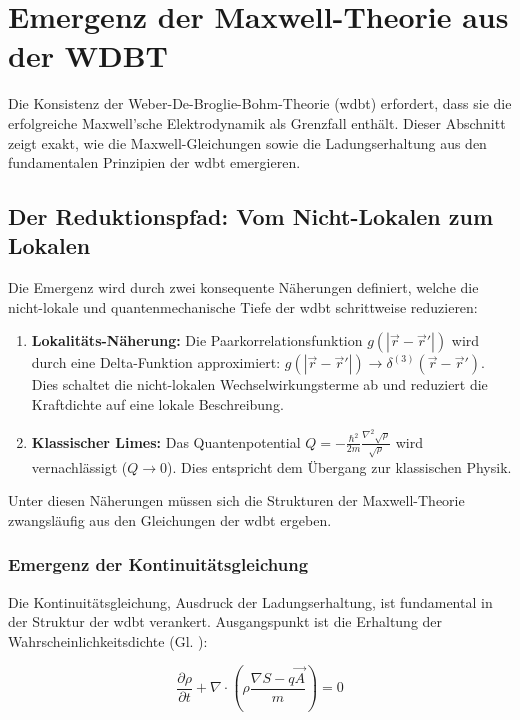 \chapter{Emergenz der Maxwell-Theorie aus der WDBT}
\label{sec:emergence-maxwell}

Die Konsistenz der Weber-De-Broglie-Bohm-Theorie (\gls{wdbt}) erfordert, dass sie die erfolgreiche Maxwell'sche Elektrodynamik als Grenzfall enthält. Dieser Abschnitt zeigt exakt, wie
die Maxwell-Gleichungen sowie die Ladungserhaltung aus den fundamentalen Prinzipien der \gls{wdbt} emergieren.

\section{Der Reduktionspfad: Vom Nicht-Lokalen zum Lokalen}

Die Emergenz wird durch zwei konsequente Näherungen definiert, welche die nicht-lokale und quantenmechanische Tiefe der \gls{wdbt} schrittweise reduzieren:

\begin{enumerate}
    \item \textbf{Lokalitäts-Näherung:} Die Paarkorrelationsfunktion $g(|\vec{r} - \vec{r}'|)$ wird durch eine Delta-Funktion approximiert: $g(|\vec{r} - \vec{r}'|) \rightarrow \delta^{(3)}(\vec{r} - \vec{r}')$. Dies schaltet die nicht-lokalen Wechselwirkungsterme ab und reduziert die Kraftdichte auf eine lokale Beschreibung.
    \item \textbf{Klassischer Limes:} Das Quantenpotential $Q = -\frac{\hbar^2}{2m} \frac{\nabla^2 \sqrt{\rho}}{\sqrt{\rho}}$ wird vernachlässigt ($Q \rightarrow 0$). Dies entspricht dem Übergang zur klassischen Physik.
\end{enumerate}

Unter diesen Näherungen müssen sich die Strukturen der Maxwell-Theorie zwangsläufig aus den Gleichungen der \gls{wdbt} ergeben.

\subsection{Emergenz der Kontinuitätsgleichung}

Die Kontinuitätsgleichung, Ausdruck der Ladungserhaltung, ist fundamental in der Struktur der \gls{wdbt} verankert. Ausgangspunkt ist die Erhaltung der Wahrscheinlichkeitsdichte (Gl. ):

\begin{equation}
    \frac{\partial \rho}{\partial t} + \nabla \cdot \left( \rho \frac{\nabla S - q\vec{A}}{m} \right) = 0
\end{equation}

